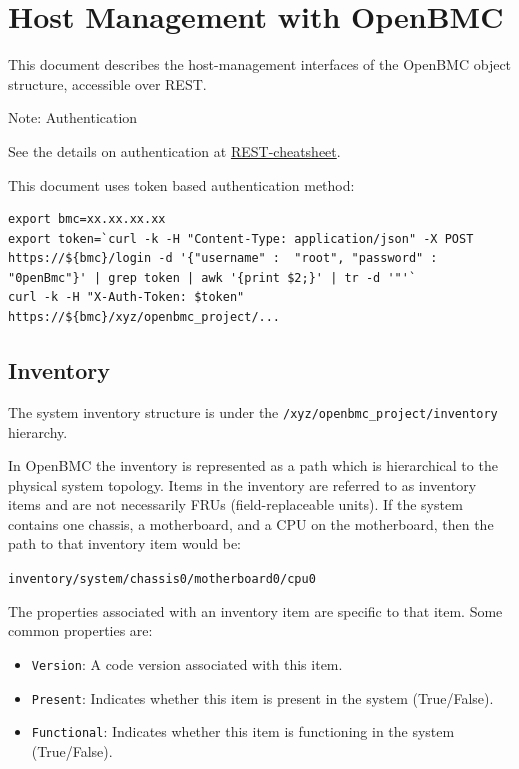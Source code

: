\hypertarget{host-management-with-openbmc}{%
\section{Host Management with
OpenBMC}\label{host-management-with-openbmc}}

This document describes the host-management interfaces of the OpenBMC
object structure, accessible over REST.

Note: Authentication

See the details on authentication at
\href{https://github.com/openbmc/docs/blob/master/REST-cheatsheet.md\#establish-rest-connection-session}{REST-cheatsheet}.

This document uses token based authentication method:

\begin{verbatim}
export bmc=xx.xx.xx.xx
export token=`curl -k -H "Content-Type: application/json" -X POST https://${bmc}/login -d '{"username" :  "root", "password" :  "0penBmc"}' | grep token | awk '{print $2;}' | tr -d '"'`
curl -k -H "X-Auth-Token: $token" https://${bmc}/xyz/openbmc_project/...
\end{verbatim}

\hypertarget{inventory}{%
\subsection{Inventory}\label{inventory}}

The system inventory structure is under the
\texttt{/xyz/openbmc\_project/inventory} hierarchy.

In OpenBMC the inventory is represented as a path which is hierarchical
to the physical system topology. Items in the inventory are referred to
as inventory items and are not necessarily FRUs (field-replaceable
units). If the system contains one chassis, a motherboard, and a CPU on
the motherboard, then the path to that inventory item would be:

\texttt{inventory/system/chassis0/motherboard0/cpu0}

The properties associated with an inventory item are specific to that
item. Some common properties are:

\begin{itemize}
\tightlist
\item
  \texttt{Version}: A code version associated with this item.
\item
  \texttt{Present}: Indicates whether this item is present in the system
  (True/False).
\item
  \texttt{Functional}: Indicates whether this item is functioning in the
  system (True/False).
\end{itemize}

